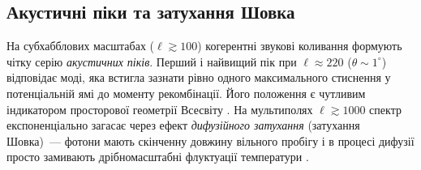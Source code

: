 \documentclass[12pt, a4paper]{article}
\begin{document}
\subsection{Акустичні піки та затухання Шовка}

На субхабблових масштабах ($\ell \gtrsim 100$) когерентні звукові коливання формують чітку серію \emph{акустичних піків}. Перший і найвищий пік при $\ell \approx 220$ ($\theta \sim 1^\circ$) відповідає моді, яка встигла зазнати рівно одного максимального стиснення у потенціальній ямі до моменту рекомбінації. Його положення є чутливим індикатором просторової геометрії Всесвіту \cite{planck_2018}. На мультиполях $\ell \gtrsim 1000$ спектр експоненціально загасає через ефект \emph{дифузійного затухання} (затухання Шовка)~--- фотони мають скінченну довжину вільного пробігу і в процесі дифузії просто замивають дрібномасштабні флуктуації температури \cite{silk_1968}.
\end{document}
